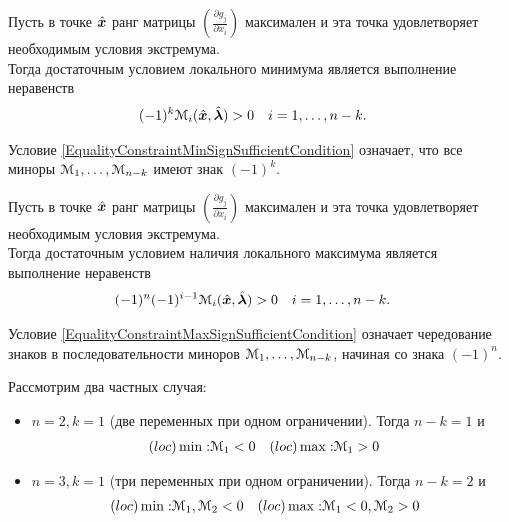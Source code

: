 \begin{teorema}\label{EqualityConstraintMinSufficientCondition}
Пусть в точке $\hat{{\bm x}}$  ранг матрицы $(\frac{\partial g_j}{\partial x_i})$ максимален и 
эта точка удовлетворяет необходимым условия экстремума.\\
Тогда достаточным условием локального минимума является выполнение неравенств
\begin{align}\label{EqualityConstraintMinSignSufficientCondition}
	(-1)^k{\mathcal M}_i(\hat{{\bm x}},\hat{{\bm{ \lambda}}})&>0 & 
	i&=1,\ldots,n-k.
\end{align}
\end{teorema}
\begin{remark}
Условие \eqref{EqualityConstraintMinSignSufficientCondition} означает, что
все миноры ${\mathcal M}_1,\ldots,{\mathcal M}_{n-k}$ имеют знак $(-1)^k$.
\end{remark}

\begin{teorema}\label{EqualityConstraintMaxSufficientCondition}
Пусть в точке $\hat{{\bm x}}$  ранг матрицы $(\frac{\partial g_j}{\partial x_i})$ максимален и 
эта точка удовлетворяет необходимым условия экстремума.\\
Тогда достаточным условием наличия локального максимума является выполнение неравенств
\begin{align}\label{EqualityConstraintMaxSignSufficientCondition}
	(-1)^n(-1)^{i-1}{\mathcal M}_i(\hat{{\bm x}},\hat{{\bm{ \lambda}}})&>0 & 
	i&=1,\ldots,n-k.
\end{align}
\end{teorema}
\begin{remark}
Условие \eqref{EqualityConstraintMaxSignSufficientCondition} означает чередование знаков
в последовательности миноров ${\mathcal M}_1,\ldots,{\mathcal M}_{n-k}$, начиная со знака $(-1)^n$.
\end{remark}
Рассмотрим два частных случая:
\begin{itemize}
	\item \(n=2,k=1\) (две переменных при одном ограничении). Тогда 
	\(n-k=1\) и 
	\begin{align*}
		(loc)\min:& {\mathcal M}_1<0 & (loc)\max:& {\mathcal M}_1>0
	\end{align*}
	\item \(n=3,k=1\) (три переменных при одном ограничении). Тогда 
	\(n-k=2\) и 
	\begin{align*}
		(loc)\min:& {\mathcal M}_1,{\mathcal M}_2<0 & 
		(loc)\max:& {\mathcal M}_1<0,{\mathcal M}_2>0
	\end{align*}
\end{itemize}
	